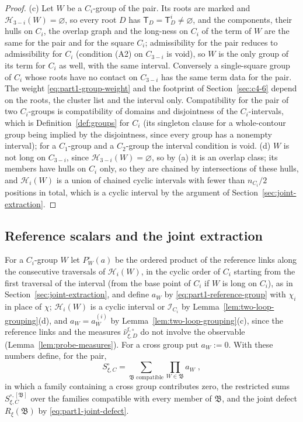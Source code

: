 \begin{proof}
(c) Let $W$ be a $C_i$-group of the pair. Its roots are marked and $\mathcal H_{3-i}(W)=\varnothing$, so every root $D$ has $\mathsf T_D=\mathsf T^i_D\neq\varnothing$, and the components, their hulls on $C_i$, the overlap graph and the long-ness on $C_i$ of the term of $W$ are the same for the pair and for the square $C_i$; admissibility for the pair reduces to admissibility for $C_i$ (condition (A2) on $C_{3-i}$ is void), so $W$ is the only group of its term for $C_i$ as well, with the same interval. Conversely a single-square group of $C_i$ whose roots have no contact on $C_{3-i}$ has the same term data for the pair. The weight \eqref{eq:part1-group-weight} and the footprint of Section~\ref{sec:c4-6} depend on the roots, the cluster list and the interval only. Compatibility for the pair of two $C_i$-groups is compatibility of domains and disjointness of the $C_i$-intervals, which is Definition~\ref{def:groups} for $C_i$ (its singleton clause for a whole-contour group being implied by the disjointness, since every group has a nonempty interval); for a $C_1$-group and a $C_2$-group the interval condition is void. (d) $W$ is not long on $C_{3-i}$, since $\mathcal H_{3-i}(W)=\varnothing$, so by (a) it is an overlap class; its members have hulls on $C_i$ only, so they are chained by intersections of these hulls, and $\mathcal H_i(W)$ is a union of chained cyclic intervals with fewer than $n_{C_i}/2$ positions in total, which is a cyclic interval by the argument of Section~\ref{sec:joint-extraction}.
\end{proof}

\subsection{Reference scalars and the joint extraction}\label{sec:two-loops-extraction}
For a $C_i$-group $W$ let $P^\circ_W(a)$ be the ordered product of the reference links along the consecutive traversals of $\mathcal H_i(W)$, in the cyclic order of $C_i$ starting from the first traversal of the interval (from the base point of $C_i$ if $W$ is long on $C_i$), as in Section~\ref{sec:joint-extraction}, and define $a_W$ by \eqref{eq:part1-reference-group} with $\chi_i$ in place of $\chi$; $\mathcal H_i(W)$ is a cyclic interval or $\mathcal I_{C_i}$ by Lemma~\ref{lem:two-loop-grouping}(d), and $a_W=a^{(i)}_W$ by Lemma~\ref{lem:two-loop-grouping}(c), since the reference links and the measures $\widehat\nu^{\mathrm f,\circ}_{\xi,D}$ do not involve the observable (Lemma~\ref{lem:probe-measures}). For a cross group put $a_W:=0$. With these numbers define, for the pair,
\begin{equation}\label{eq:two-loop-reference-gas}
    S^\circ_{\xi,C}=\sum_{\mathfrak B\text{ compatible}}\prod_{W\in\mathfrak B}a_W\;,
\end{equation}
in which a family containing a cross group contributes zero, the restricted sums $S^{\circ,[\mathfrak B]}_{\xi,C}$ over the families compatible with every member of $\mathfrak B$, and the joint defect $R_\xi(\mathfrak B)$ by \eqref{eq:part1-joint-defect}.

